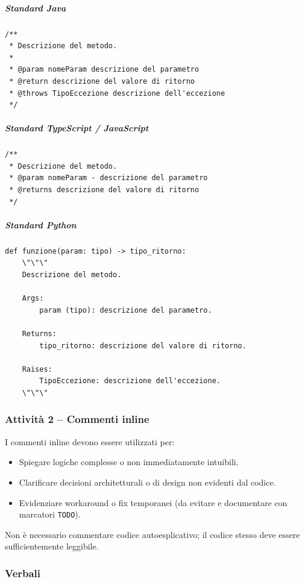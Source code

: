 \documentclass[a4paper, 11pt, oneside]{scrartcl}
\begin{document}
\subparagraph{Standard Java}
\begin{verbatim}
/**
 * Descrizione del metodo.
 *
 * @param nomeParam descrizione del parametro
 * @return descrizione del valore di ritorno
 * @throws TipoEccezione descrizione dell'eccezione
 */
\end{verbatim}

\subparagraph{Standard TypeScript / JavaScript}
\begin{verbatim}
/**
 * Descrizione del metodo.
 * @param nomeParam - descrizione del parametro
 * @returns descrizione del valore di ritorno
 */
\end{verbatim}

\subparagraph{Standard Python}
\begin{verbatim}
def funzione(param: tipo) -> tipo_ritorno:
    \"\"\"
    Descrizione del metodo.

    Args:
        param (tipo): descrizione del parametro.

    Returns:
        tipo_ritorno: descrizione del valore di ritorno.

    Raises:
        TipoEccezione: descrizione dell'eccezione.
    \"\"\"
\end{verbatim}

\subsubsection{Attività 2 -- Commenti inline}

I commenti inline devono essere utilizzati per:
\begin{itemize}
    \item Spiegare logiche complesse o non immediatamente intuibili.
    \item Clarificare decisioni architetturali o di design non evidenti dal codice.
    \item Evidenziare workaround o fix temporanei (da evitare e documentare con marcatori \texttt{TODO}).
\end{itemize}
Non è necessario commentare codice autoesplicativo; il codice stesso deve essere sufficientemente leggibile.

\subsubsection{Verbali}
\label{sec:verbali}
\end{document}

